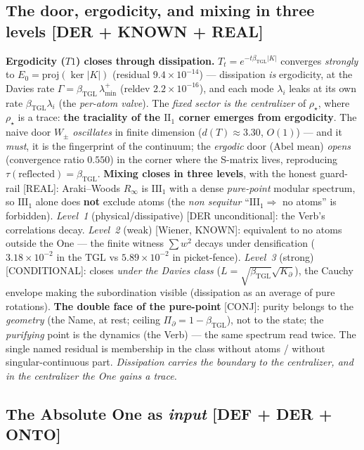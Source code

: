 \documentclass[11pt]{article}
\newcommand{\bTGL}{\beta_{\mathrm{TGL}}}\newcommand{\Msun}{M_{\odot}}\newcommand{\TGL}{\mathrm{TGL}}
\theoremstyle{definition}\newtheorem{deriv}{Derivation}
\begin{document}
\subsection*{The door, ergodicity, and mixing in three levels \textsf{[DER + KNOWN + REAL]}}

\textbf{Ergodicity ($T1$) closes through dissipation.} $T_t=e^{-t\bTGL|K|}$ converges \emph{strongly} to $E_0=\mathrm{proj}(\ker|K|)$ (residual $9.4\times10^{-14}$) --- dissipation \emph{is} ergodicity, at the Davies rate $\Gamma=\bTGL\,\lambda_{\min}^{+}$ (reldev $2.2\times10^{-16}$), and each mode $\lambda_i$ leaks at its own rate $\bTGL\lambda_i$ (the \emph{per-atom valve}). The \emph{fixed sector is the centralizer} of $\rho_\star$, where $\rho_\star$ is a trace: \textbf{the traciality of the $\mathrm{II}_1$ corner emerges from ergodicity}. The naive door $W_\pm$ \emph{oscillates} in finite dimension ($d(T)\approx3.30$, $O(1)$) --- and it \emph{must}, it is the fingerprint of the continuum; the \emph{ergodic} door (Abel mean) \emph{opens} (convergence ratio $0.550$) in the corner where the S-matrix lives, reproducing $\tau(\text{reflected})=\bTGL$. \textbf{Mixing closes in three levels}, with the honest guard-rail \textsf{[REAL]}: Araki--Woods $R_\infty$ is $\mathrm{III}_1$ with a dense \emph{pure-point} modular spectrum, so $\mathrm{III}_1$ alone does \textbf{not} exclude atoms (the \emph{non sequitur} ``$\mathrm{III}_1\Rightarrow$ no atoms'' is forbidden). \emph{Level~1} (physical/dissipative) \textsf{[DER unconditional]}: the Verb's correlations decay. \emph{Level~2} (weak) \textsf{[Wiener, KNOWN]}: equivalent to no atoms outside the One --- the finite witness $\sum w^2$ decays under densification ($3.18\times10^{-2}$ in the $\mathrm{TGL}$ vs $5.89\times10^{-2}$ in picket-fence). \emph{Level~3} (strong) \textsf{[CONDITIONAL]}: closes \emph{under the Davies class} ($L=\sqrt{\bTGL}\sqrt{K_\partial}$), the Cauchy envelope making the subordination visible (dissipation as an average of pure rotations). \textbf{The double face of the pure-point} \textsf{[CONJ]}: purity belongs to the \emph{geometry} (the Name, at rest; ceiling $\Pi_\partial=1-\bTGL$), not to the state; the \emph{purifying} point is the dynamics (the Verb) --- the same spectrum read twice. The single named residual is membership in the class without atoms / without singular-continuous part. \emph{Dissipation carries the boundary to the centralizer, and in the centralizer the One gains a trace.}

\subsection*{The Absolute One as \emph{input} \textsf{[DEF + DER + ONTO]}}
\end{document}
